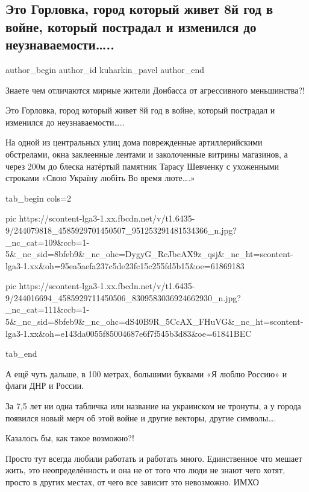 
 
 
 
 
 
\subsection{Это Горловка, город который живет 8й год в войне, который пострадал и изменился до неузнаваемости…..}
\label{sec:01_10_2021.fb.kuharkin_pavel.1.gorlovka}
 
\ifcmt
 author_begin
   author_id kuharkin_pavel
 author_end
\fi

Знаете чем отличаются мирные жители Донбасса от агрессивного меньшинства?!

Это Горловка, город который живет 8й год в войне, который пострадал и изменился
до неузнаваемости…..

На одной из центральных улиц дома поврежденные артиллерийскими обстрелами, окна
заклеенные лентами и заколоченные витрины магазинов, а  через 200м до блеска
натёртый памятник Тарасу Шевченку с ухоженными строками «Свою Україну любіть Во
время люте….»

\ifcmt
  tab_begin cols=2

     pic https://scontent-lga3-1.xx.fbcdn.net/v/t1.6435-9/244079818_4585929701450507_951253291481534366_n.jpg?_nc_cat=109&ccb=1-5&_nc_sid=8bfeb9&_nc_ohc=DygyG_RcJbcAX9z_qsj&_nc_ht=scontent-lga3-1.xx&oh=95ea5aefa237c5de23fc15c255fd5b15&oe=61869183

     pic https://scontent-lga3-1.xx.fbcdn.net/v/t1.6435-9/244016694_4585929711450506_8309583036924662930_n.jpg?_nc_cat=111&ccb=1-5&_nc_sid=8bfeb9&_nc_ohc=dS40B9R_5CcAX_FHuVG&_nc_ht=scontent-lga3-1.xx&oh=e143da0055f85004687e6f7f545b3d83&oe=61841BEC

  tab_end
\fi

А ещё чуть дальше, в 100 метрах, большими буквами «Я люблю Россию» и флаги ДНР
и России. 

За 7,5 лет ни одна табличка или название на украинском не тронуты, а у города
появился новый мерч об этой войне и другие векторы, другие символы….

Казалось бы, как такое возможно?!

Просто тут всегда любили работать и работать много.  Единственное что мешает
жить, это неопределённость и она не от того что люди не знают чего хотят,
просто в других местах, от чего все зависит  это невозможно. ИМХО

